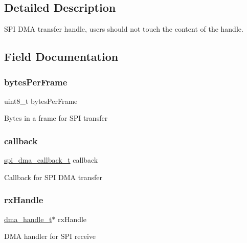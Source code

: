 \subsection{Detailed Description}
S\+PI D\+MA transfer handle, users should not touch the content of the handle. 

\subsection{Field Documentation}
\mbox{\label{struct__spi__dma__handle_a34a1eb6e4f11adc3ae8969e5ba57fee0}} 
\subsubsection{\texorpdfstring{bytesPerFrame}{bytesPerFrame}}
{\footnotesize\ttfamily uint8\+\_\+t bytes\+Per\+Frame}

Bytes in a frame for S\+PI transfer \mbox{\label{struct__spi__dma__handle_a13ae89c943e013f5d86912809bf15998}} 
\subsubsection{\texorpdfstring{callback}{callback}}
{\footnotesize\ttfamily \mbox{\hyperlink{group__spi__dma__driver_gacbd157eee3bc09fe3156002bf242d15f}{spi\+\_\+dma\+\_\+callback\+\_\+t}} callback}

Callback for S\+PI D\+MA transfer \mbox{\label{struct__spi__dma__handle_ac7ec064148024aecf3310655c0eb79a3}} 
\subsubsection{\texorpdfstring{rxHandle}{rxHandle}}
{\footnotesize\ttfamily \mbox{\hyperlink{group__dma_gac4a65788d7e5762d16a41a50b2cd7956}{dma\+\_\+handle\+\_\+t}}$\ast$ rx\+Handle}

D\+MA handler for S\+PI receive \mbox{\label{struct__spi__dma__handle_a3fd0074ef5f28778f3a3a4b31a095953}} 
